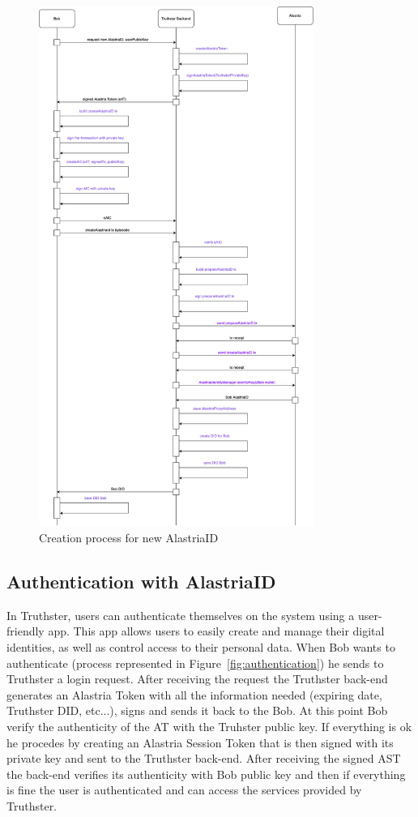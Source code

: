 \documentclass[target=mst,aauheader=]{thud}
\begin{document}
\begin{figure}
    \centering
    \includegraphics[width=0.8\textwidth]{images/createNewAlastriaID.png}
    \caption{Creation process for new AlastriaID}
    \label{fig:addAlastriaID}
\end{figure}

\subsection{Authentication with AlastriaID}

In Truthster, users can authenticate themselves on the system using a user-friendly app. This app allows users to easily create and manage their digital identities, as well as control access to their personal data.
When Bob wants to authenticate (process represented in Figure~\ref{fig:authentication}) he sends to Truthster a login request. After receiving the request the Truthster back-end generates an Alastria Token with all the information needed (expiring date, Truthster DID, etc...), signs and sends it back to the Bob. At this point Bob verify the authenticity of the AT with the Truhster public key. If everything is ok he procedes by creating an Alastria Session Token that is then signed with its private key and sent to the Truthster back-end. After receiving the signed AST the back-end verifies its authenticity with Bob public key and then if everything is fine the user is authenticated and can access the services provided by Truthster.
\end{document}

